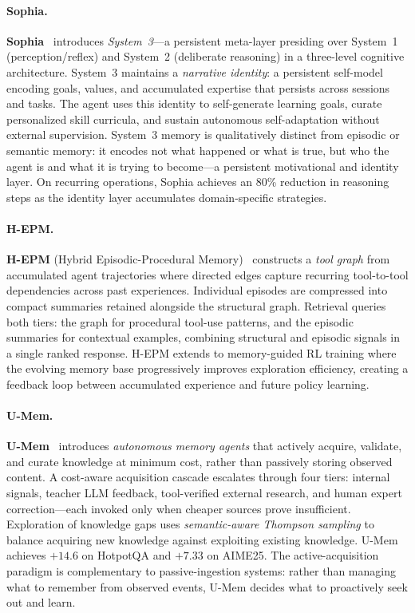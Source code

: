 \paragraph{Sophia.}
\textbf{Sophia}~\cite{sophia2025} introduces \emph{System~3}---a
persistent meta-layer presiding over System~1 (perception/reflex)
and System~2 (deliberate reasoning) in a three-level cognitive
architecture.  System~3 maintains a \emph{narrative identity}: a
persistent self-model encoding goals, values, and accumulated expertise
that persists across sessions and tasks.  The agent uses this identity
to self-generate learning goals, curate personalized skill curricula,
and sustain autonomous self-adaptation without external supervision.
System~3 memory is qualitatively distinct from episodic or semantic
memory: it encodes not what happened or what is true, but who the
agent is and what it is trying to become---a persistent motivational
and identity layer.  On recurring operations, Sophia achieves an
80\% reduction in reasoning steps as the identity layer accumulates
domain-specific strategies.

\paragraph{H-EPM.}
\textbf{H-EPM} (Hybrid Episodic-Procedural
Memory)~\cite{hepm2025} constructs a \emph{tool graph} from accumulated
agent trajectories where directed edges capture recurring tool-to-tool
dependencies across past experiences.  Individual episodes are
compressed into compact summaries retained alongside the structural
graph.  Retrieval queries both tiers: the graph for procedural
tool-use patterns, and the episodic summaries for contextual examples,
combining structural and episodic signals in a single ranked response.
H-EPM extends to memory-guided RL training where the evolving memory
base progressively improves exploration efficiency, creating a feedback
loop between accumulated experience and future policy learning.

\paragraph{U-Mem.}
\textbf{U-Mem}~\cite{umem2026} introduces \emph{autonomous memory
agents} that actively acquire, validate, and curate knowledge at
minimum cost, rather than passively storing observed content.
A cost-aware acquisition cascade escalates through four tiers: internal
signals, teacher LLM feedback, tool-verified external research, and
human expert correction---each invoked only when cheaper sources prove
insufficient.  Exploration of knowledge gaps uses
\emph{semantic-aware Thompson sampling} to balance acquiring new
knowledge against exploiting existing knowledge.  U-Mem achieves
$+14.6$ on HotpotQA and $+7.33$ on AIME25.  The active-acquisition
paradigm is complementary to passive-ingestion systems: rather than
managing what to remember from observed events, U-Mem decides what to
proactively seek out and learn.

